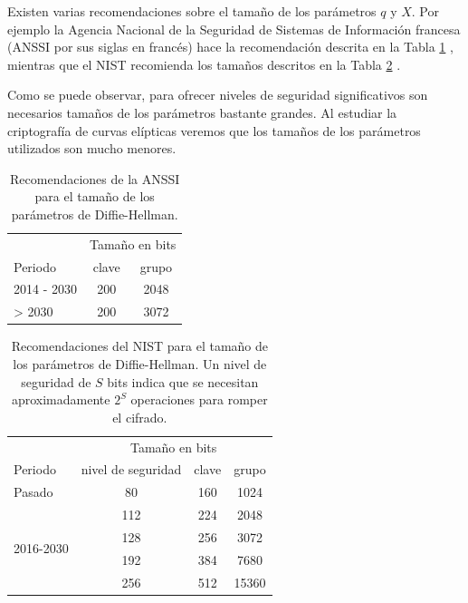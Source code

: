 \documentclass[
  a4paper,
  12pt,
  spanish,
]{scrartcl}
\begin{document}
Existen varias recomendaciones sobre el tamaño de los parámetros \(q\) y \(X\). Por ejemplo la Agencia Nacional de la Seguridad de Sistemas de Información francesa (ANSSI por sus siglas en francés) hace la recomendación descrita en la Tabla \ref{tab:tam-anssi} \parencite{anssi_mecanismes_2014}, mientras que el NIST recomienda los tamaños descritos en la Tabla \ref{tab:tam-nist} \parencite{barker_recommendation_2016}.

Como se puede observar, para ofrecer niveles de seguridad significativos son necesarios tamaños de los parámetros bastante grandes. Al estudiar la criptografía de curvas elípticas veremos que los tamaños de los parámetros utilizados son mucho menores.

\begin{table}[h]
  \centering
  \sffamily
  \begin{tabular}{lcc}
    \toprule
    & \multicolumn{2}{c}{Tamaño en bits} \\
    Periodo & clave & grupo \\
    \midrule
    2014 - 2030 & 200 & 2048\\
    > 2030 & 200 & 3072\\
    \bottomrule
  \end{tabular}
  \caption{Recomendaciones de la ANSSI para el tamaño de los parámetros de Diffie-Hellman.}
  \label{tab:tam-anssi}
\end{table}

\begin{table}[h]
  \centering
  \sffamily
  \begin{tabular}{lccc}
    \toprule
     & \multicolumn{3}{c}{Tamaño en bits} \\
    Periodo & nivel de seguridad & clave & grupo \\
    \midrule
    Pasado & 80 & 160 & 1024\\
    \multirow[t]{4}{*}{2016-2030} & 112 & 224 & 2048\\
     & 128 & 256 & 3072\\
     & 192 & 384 & 7680\\
     & 256 & 512 & 15360\\
    \bottomrule
  \end{tabular}
  \caption{Recomendaciones del NIST para el tamaño de los parámetros de Diffie-Hellman. Un nivel de seguridad de \(S\) bits indica que se necesitan aproximadamente \(2^S\) operaciones para romper el cifrado.}
  \label{tab:tam-nist}
\end{table}
\end{document}

